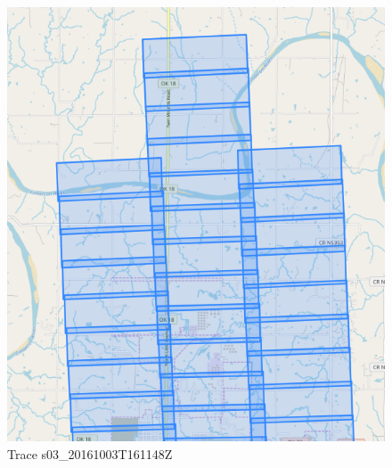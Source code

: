 \documentclass[paper=a4, fontsize=11pt, onecolumn, tikz, dvipsnames, svgnames, x11names]{article}
\begin{document}
\newpage
\begin{figure}
    \centering
    \includegraphics[height = 0.8\textheight]{trace_8Z.png}
    \caption{Trace s03\_20161003T161148Z}
    \label{fig_trace_8Z}
\end{figure}
\end{document}
